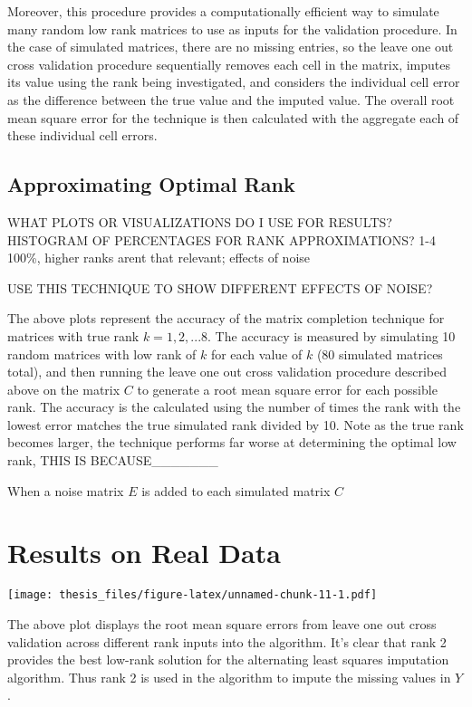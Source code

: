 \documentclass[12pt,twoside]{dukestatscithesis}
\theoremstyle{definition}
\theoremstyle{definition}
\theoremstyle{definition}
\theoremstyle{remark}
\begin{document}
Moreover, this procedure provides a computationally efficient way to
simulate many random low rank matrices to use as inputs for the
validation procedure. In the case of simulated matrices, there are no
missing entries, so the leave one out cross validation procedure
sequentially removes each cell in the matrix, imputes its value using
the rank being investigated, and considers the individual cell error as
the difference between the true value and the imputed value. The overall
root mean square error for the technique is then calculated with the
aggregate each of these individual cell errors.

\subsection{Approximating Optimal
Rank}\label{approximating-optimal-rank}

WHAT PLOTS OR VISUALIZATIONS DO I USE FOR RESULTS? HISTOGRAM OF
PERCENTAGES FOR RANK APPROXIMATIONS? 1-4 100\%, higher ranks arent that
relevant; effects of noise

USE THIS TECHNIQUE TO SHOW DIFFERENT EFFECTS OF NOISE?

The above plots represent the accuracy of the matrix completion
technique for matrices with true rank \(k = 1,2,...8\). The accuracy is
measured by simulating 10 random matrices with low rank of \(k\) for
each value of \(k\) (80 simulated matrices total), and then running the
leave one out cross validation procedure described above on the matrix
\(C\) to generate a root mean square error for each possible rank. The
accuracy is the calculated using the number of times the rank with the
lowest error matches the true simulated rank divided by 10. Note as the
true rank becomes larger, the technique performs far worse at
determining the optimal low rank, THIS IS BECAUSE\_\_\_\_\_\_\_

When a noise matrix \(E\) is added to each simulated matrix \(C\)

\section{Results on Real Data}\label{results-on-real-data}

\texttt{[image: thesis\_files/figure-latex/unnamed-chunk-11-1.pdf]}

The above plot displays the root mean square errors from leave one out
cross validation across different rank inputs into the algorithm. It's
clear that rank 2 provides the best low-rank solution for the
alternating least squares imputation algorithm. Thus rank 2 is used in
the algorithm to impute the missing values in \(Y\).
\end{document}
